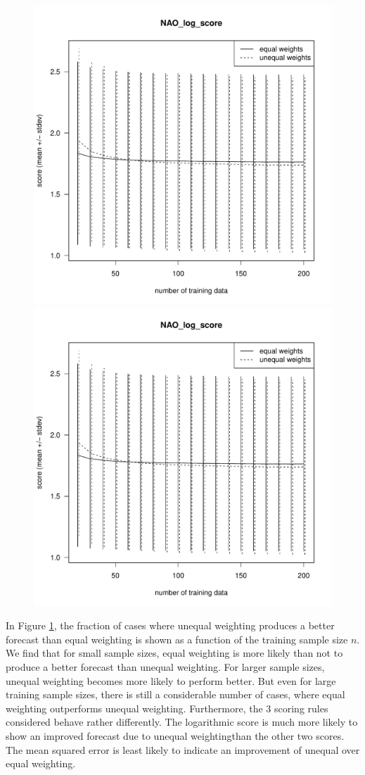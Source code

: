 \documentclass[12pt]{article}
\begin{document}
\begin{figure}
\begin{center}
\includegraphics[width=.7\textwidth, page=7]{../R/n-dependence.pdf}\\
\includegraphics[width=.7\textwidth, page=8]{../R/n-dependence.pdf}\\
\end{center}
\caption{}
\label{fig:prob_impr}
\end{figure}

In Figure \ref{fig:prob_impr}, the fraction of cases where unequal weighting produces a better forecast than equal weighting is shown as a function of the training sample size $n$.
We find that for small sample sizes, equal weighting is more likely than not to produce a better forecast than unequal weighting.
For larger sample sizes, unequal weighting becomes more likely to perform better.
But even for large training sample sizes, there is still a considerable number of cases, where equal weighting outperforms unequal weighting.
Furthermore, the 3 scoring rules considered behave rather differently.
The logarithmic score is much more likely to show an improved forecast due to unequal weightingthan the other two scores.
The mean squared error is least likely to indicate an improvement of unequal over equal weighting.
\end{document}
